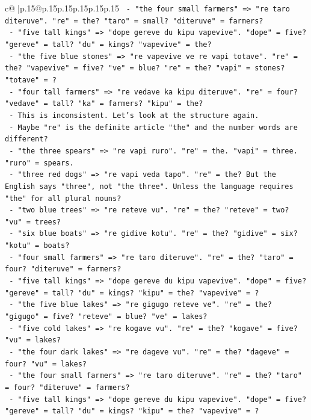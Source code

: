 \documentclass{article}
\begin{document}
{\begin{supertabular}{c@{$\;$}|p{.15\linewidth}@{}p{.15\linewidth}p{.15\linewidth}p{.15\linewidth}p{.15\linewidth}p{.15\linewidth}}
{{{\texttt{    {-} "the four small farmers" => "re taro diteruve". "re" = the? "taro" = small? "diteruve" = farmers?} \\
\texttt{    {-} "five tall kings" => "dope gereve du kipu vapevive". "dope" = five? "gereve" = tall? "du" = kings? "vapevive" = the?} \\
\texttt{    {-} "the five blue stones" => "re vapevive ve re vapi totave". "re" = the? "vapevive" = five? "ve" = blue? "re" = the? "vapi" = stones? "totave" = ?} \\
\texttt{    {-} "four tall farmers" => "re vedave ka kipu diteruve". "re" = four? "vedave" = tall? "ka" = farmers? "kipu" = the?} \\
\texttt{    {-} This is inconsistent. Let's look at the structure again.} \\
\texttt{    {-} Maybe "re" is the definite article "the" and the number words are different?} \\
\texttt{    {-} "the three spears" => "re vapi ruro". "re" = the. "vapi" = three. "ruro" = spears.} \\
\texttt{    {-} "three red dogs" => "re vapi veda tapo". "re" = the? But the English says "three", not "the three". Unless the language requires "the" for all plural nouns?} \\
\texttt{    {-} "two blue trees" => "re reteve vu". "re" = the? "reteve" = two? "vu" = trees?} \\
\texttt{    {-} "six blue boats" => "re gidive kotu". "re" = the? "gidive" = six? "kotu" = boats?} \\
\texttt{    {-} "four small farmers" => "re taro diteruve". "re" = the? "taro" = four? "diteruve" = farmers?} \\
\texttt{    {-} "five tall kings" => "dope gereve du kipu vapevive". "dope" = five? "gereve" = tall? "du" = kings? "kipu" = the? "vapevive" = ?} \\
\texttt{    {-} "the five blue lakes" => "re gigugo reteve ve". "re" = the? "gigugo" = five? "reteve" = blue? "ve" = lakes?} \\
\texttt{    {-} "five cold lakes" => "re kogave vu". "re" = the? "kogave" = five? "vu" = lakes?} \\
\texttt{    {-} "the four dark lakes" => "re dageve vu". "re" = the? "dageve" = four? "vu" = lakes?} \\
\texttt{    {-} "the four small farmers" => "re taro diteruve". "re" = the? "taro" = four? "diteruve" = farmers?} \\
\texttt{    {-} "five tall kings" => "dope gereve du kipu vapevive". "dope" = five? "gereve" = tall? "du" = kings? "kipu" = the? "vapevive" = ?} \\
}}}
\end{supertabular}}
\end{document}
